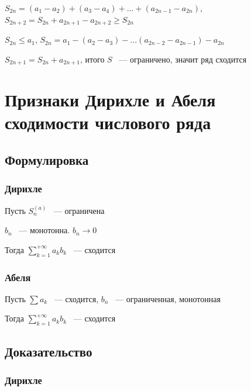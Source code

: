 \documentclass{article}
\begin{document}
            $S_{2n} = (a_1 - a_2) + (a_3 - a_4) + \ldots + (a_{2n - 1} - a_{2n})$, $S_{2n + 2} = S_{2n} + a_{2n + 1} - a_{2n + 2} \geq S_{2n}$
            
            $S_{2n} \leq a_1$, $S_{2n} = a_1 - (a_2 - a_3) - \ldots (a_{2n - 2} - a_{2n - 1}) - a_{2n}$
            
            $S_{2n + 1} = S_{2n} + a_{2n + 1}$, итого $S$ ~--- ограничено, значит ряд сходится
            
    \newpage
    
    \section{Признаки Дирихле и Абеля сходимости числового ряда}
    
        \subsection{Формулировка}
        
            \subsubsection{Дирихле}
            
                Пусть $S^{(a)}_n$ ~--- ограничена
                
                $b_n$ ~--- монотонна. $b_n \rightarrow 0$
                
                Тогда $\sum\limits^{+\infty}_{k = 1} a_k b_k$ ~--- сходится
                
            \subsubsection{Абеля}
            
                Пусть $\sum a_k$ ~--- сходится, $b_n$ ~--- ограниченная, монотонная
                
                Тогда $\sum\limits^{+\infty}_{k = 1} a_k b_k$ ~--- сходится 
                
        \subsection{Доказательство}
        
            \subsubsection{Дирихле}
            
\end{document}
